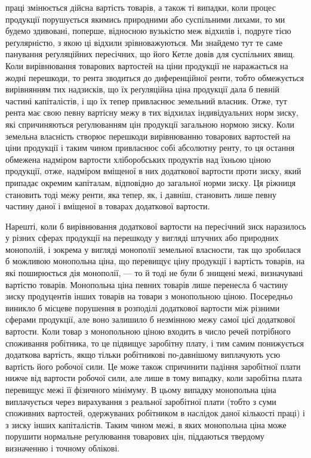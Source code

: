 \parcont{}  %
праці змінюється дійсна вартість товарів, а також ті випадки, коли процес продукції
порушується якимись природними або суспільними лихами, то ми будемо
здивовані, поперше, відносною вузькістю меж відхилів і, подруге тією реґулярністю,
з якою ці відхили зрівноважуються. Ми знайдемо тут те саме панування
реґуляційних пересічних, що його Кетле довів для суспільних явищ. Коли вирівнювання
товарових вартостей на ціни продукції не наражається на жодні
перешкоди, то рента зводиться до диференційної ренти, тобто обмежується вирівнянням
тих надзисків, що їх реґуляційна ціна продукції дала б певній
частині капіталістів, і що їх тепер привласнює земельний власник. Отже, тут рента
має свою певну вартісну межу в тих відхилах індивідуальних норм зиску, які
спричиняються реґулюванням цін продукції загальною нормою зиску. Коли земельна
власність створює перешкоди вирівнюванню товарових вартостей на ціни
продукції і таким чином привласнює собі абсолютну ренту, то ця остання обмежена
надміром вартости хліборобських продуктів над їхньою ціною продукції,
отже, надміром вміщеної в них додаткової вартости проти зиску, який припадає
окремим капіталам, відповідно до загальної норми зиску. Ця ріжниця становить
тоді межу ренти, яка тепер, як, і давніш, становить лише певну частину
даної і вміщеної в товарах додаткової вартости.

Нарешті, коли б вирівнювання додаткової вартости на пересічний зиск
наразилось у різних сферах продукції на перешкоду у вигляді штучних або
природних монополій, і зокрема у вигляді монополії земельної власности,
так що зробилася б можливою монопольна ціна, що перевищує ціну продукції
і вартість товарів, на які поширюється дія монополії, — то й тоді не були б
знищені межі, визначувані вартістю товарів. Монопольна ціна певних товарів
лише перенесла б частину зиску продуцентів інших товарів на товари з монопольною
ціною. Посередньо виникло б місцеве порушення в розподілі додаткової
вартости між різними сферами продукції, але воно залишило б незмінною
межу самої цієї додаткової вартости. Коли товар з монопольною
ціною входить в число речей потрібного споживання робітника, то це підвищує
заробітну плату, і тим самим понижується додаткова вартість, якщо
тільки робітникові по-давнішому виплачують усю вартість його робочої сили.
Це може також спричинити падіння заробітної плати нижче від вартости
робочої сили, але лише в тому випадку, коли заробітна плата перевищує
межі її фізичного мінімуму. В цьому випадку монопольна ціна виплачується
через вирахування з реальної заробітної плати (тобто з суми споживних вартостей,
одержуваних робітником в наслідок даної кількості праці) і з зиску
інших капіталістів. Таким чином межі, в яких монопольна ціна може порушити
нормальне реґулювання товарових цін, піддаються твердому визначенню і точному
облікові.

